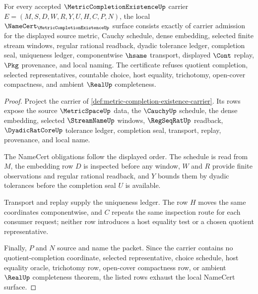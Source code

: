 \begin{theorem}
\label{thm:metric-completion-existence-namecert-obligations}
For every accepted $\MetricCompletionExistenceUp$ carrier $E=(M,S,D,W,R,Y,U,H,C,P,N)$, the local $\NameCert_{\MetricCompletionExistenceUp}$ surface consists exactly of carrier admission for the displayed source metric, Cauchy schedule, dense embedding, selected finite stream windows, regular rational readback, dyadic tolerance ledger, completion seal, uniqueness ledger, componentwise $\hsame$ transport, displayed $\Cont$ replay, $\Pkg$ provenance, and local naming. The certificate refuses quotient completion, selected representatives, countable choice, host equality, trichotomy, open-cover compactness, and ambient $\RealUp$ completeness.
\end{theorem}
\begin{proof}
Project the carrier of \autoref{def:metric-completion-existence-carrier}. Its rows expose the source $\MetricSpaceUp$ data, the $\CauchyUp$ schedule, the dense embedding, selected $\StreamNameUp$ windows, $\RegSeqRatUp$ readback, $\DyadicRatCoreUp$ tolerance ledger, completion seal, transport, replay, provenance, and local name.

The NameCert obligations follow the displayed order. The schedule is read from $M$, the embedding row $D$ is inspected before any window, $W$ and $R$ provide finite observations and regular rational readback, and $Y$ bounds them by dyadic tolerances before the completion seal $U$ is available.

Transport and replay supply the uniqueness ledger. The row $H$ moves the same coordinates componentwise, and $C$ repeats the same inspection route for each consumer request; neither row introduces a host equality test or a chosen quotient representative.

Finally, $P$ and $N$ source and name the packet. Since the carrier contains no quotient-completion coordinate, selected representative, choice schedule, host equality oracle, trichotomy row, open-cover compactness row, or ambient $\RealUp$ completeness theorem, the listed rows exhaust the local NameCert surface.
\end{proof}

